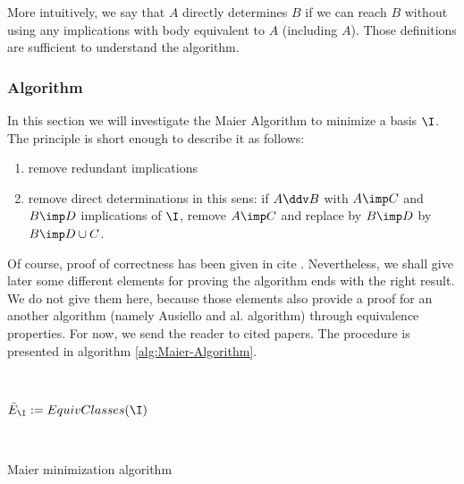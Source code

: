 More intuitively, we say that $A$ directly determines $B$ if we can reach $B$
without using any implications with body equivalent to $A$ (including $A$). 
Those definitions are sufficient to understand the algorithm. 

\subsubsection{Algorithm}

In this section we will investigate the Maier Algorithm to minimize a basis 
$\I$. The principle is short enough to describe it as follows:
\begin{enumerate}
	\item remove redundant implications
	\item remove direct determinations in this sens: if $A \ddv B$ with $A \imp 
	C$ and $B \imp D$ implications of $\I$, remove $A \imp C$ and replace by 
	$B \imp D$ by $B \imp D \cup C$. 
\end{enumerate}
\noindent Of course, proof of correctness has been given in cite 
\cite{david_minimum_1980, maier_theory_1983}. Nevertheless, we shall give later
some different elements for proving the algorithm ends with the right result. 
We do not give them here, because those elements also provide a proof for an
another algorithm (namely Ausiello and al. algorithm) through equivalence 
properties. For now, we send the reader to cited papers. The procedure is 
presented in algorithm \ref{alg:Maier-Algorithm}.


\begin{algorithm}
\KwIn{}
\KwOut{}

\BlankLine
\BlankLine

 \\

$\bar{E}_{\I} := EquivClasses(\I)$ \;

\BlankLine

 \\


\caption{Maier minimization algorithm}
\label{alg:Maier-Algorithm}
\end{algorithm}

